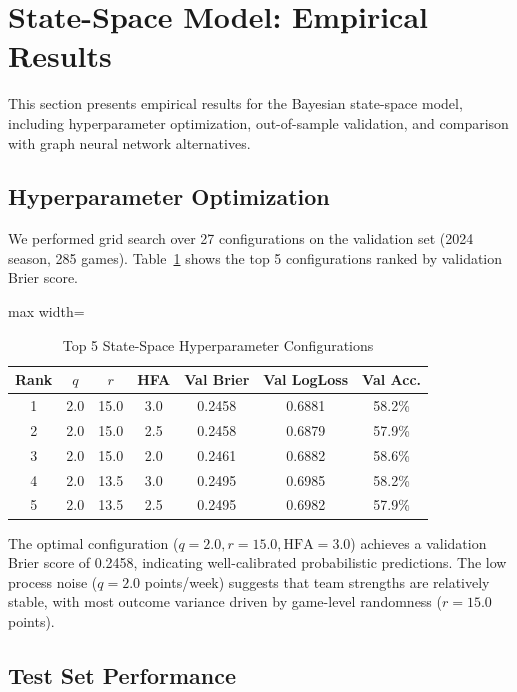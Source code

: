 \section{State-Space Model: Empirical Results}
\label{sec:state-space-results}

This section presents empirical results for the Bayesian state-space model, including hyperparameter optimization, out-of-sample validation, and comparison with graph neural network alternatives.

\subsection{Hyperparameter Optimization}

We performed grid search over 27 configurations on the validation set (2024 season, 285 games). Table~\ref{tab:state-space-hyperparameter-search} shows the top 5 configurations ranked by validation Brier score.

\begin{table}[h]
\centering
\caption{Top 5 State-Space Hyperparameter Configurations}
\label{tab:state-space-hyperparameter-search}
\begin{adjustbox}{max width=\textwidth}
\begin{tabular}{ccccccc}
\toprule
\textbf{Rank} & $q$ & $r$ & \textbf{HFA} & \textbf{Val Brier} & \textbf{Val LogLoss} & \textbf{Val Acc.} \\
\midrule
1 & 2.0 & 15.0 & 3.0 & 0.2458 & 0.6881 & 58.2\% \\
2 & 2.0 & 15.0 & 2.5 & 0.2458 & 0.6879 & 57.9\% \\
3 & 2.0 & 15.0 & 2.0 & 0.2461 & 0.6882 & 58.6\% \\
4 & 2.0 & 13.5 & 3.0 & 0.2495 & 0.6985 & 58.2\% \\
5 & 2.0 & 13.5 & 2.5 & 0.2495 & 0.6982 & 57.9\% \\
\bottomrule
\end{tabular}
\end{adjustbox}
\end{table}

The optimal configuration ($q=2.0, r=15.0, \text{HFA}=3.0$) achieves a validation Brier score of 0.2458, indicating well-calibrated probabilistic predictions. The low process noise ($q=2.0$ points/week) suggests that team strengths are relatively stable, with most outcome variance driven by game-level randomness ($r=15.0$ points).

\subsection{Test Set Performance}


